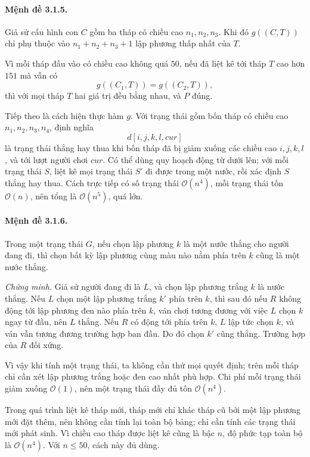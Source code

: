 \documentclass[11pt]{article}
\newcommand{\Oh}{\mathcal{O}}
\begin{document}
\paragraph{Mệnh đề 3.1.5.}
Giả sử cấu hình con \(C\) gồm ba tháp có chiều cao \(n_1,n_2,n_3\). Khi đó
\(g((C,T))\) chỉ phụ thuộc vào \(n_1+n_2+n_3+1\) lập phương thấp nhất của
\(T\).

Vì mỗi tháp đầu vào có chiều cao không quá \(50\), nếu đã liệt kê tới tháp
\(T\) cao hơn \(151\) mà vẫn có
\[
  g((C_1,T))=g((C_2,T)),
\]
thì với mọi tháp \(T\) hai giá trị đều bằng nhau, và \(P\) đúng.

Tiếp theo là cách hiện thực hàm \(g\). Với trạng thái gồm bốn tháp có chiều
cao \(n_1,n_2,n_3,n_4\), định nghĩa
\[
  d[i,j,k,l,\mathit{cur}]
\]
là trạng thái thắng hay thua khi bốn tháp đã bị giảm xuống các chiều cao
\(i,j,k,l\), và tới lượt người chơi \(\mathit{cur}\). Có thể dùng quy hoạch
động từ dưới lên; với mỗi trạng thái \(S\), liệt kê mọi trạng thái \(S'\) đi
được trong một nước, rồi xác định \(S\) thắng hay thua. Cách trực tiếp có số
trạng thái \(\Oh(n^4)\), mỗi trạng thái tốn \(\Oh(n)\), nên tổng là
\(\Oh(n^5)\), quá lớn.

\paragraph{Mệnh đề 3.1.6.}
Trong một trạng thái \(G\), nếu chọn lập phương \(k\) là một nước thắng cho
người đang đi, thì chọn bất kỳ lập phương cùng màu nào nằm phía trên \(k\)
cũng là một nước thắng.

\emph{Chứng minh.}
Giả sử người đang đi là \(L\), và chọn lập phương trắng \(k\) là nước thắng.
Nếu \(L\) chọn một lập phương trắng \(k'\) phía trên \(k\), thì sau đó nếu
\(R\) không động tới lập phương đen nào phía trên \(k\), ván chơi tương đương
với việc \(L\) chọn \(k\) ngay từ đầu, nên \(L\) thắng. Nếu \(R\) có động tới
phía trên \(k\), \(L\) lập tức chọn \(k\), và ván vẫn tương đương trường hợp
ban đầu. Do đó chọn \(k'\) cũng thắng. Trường hợp của \(R\) đối xứng.

Vì vậy khi tính một trạng thái, ta không cần thử mọi quyết định; trên mỗi tháp
chỉ cần xét lập phương trắng hoặc đen cao nhất phù hợp. Chi phí mỗi trạng thái
giảm xuống \(\Oh(1)\), nên một trạng thái đầy đủ tốn \(\Oh(n^4)\).

Trong quá trình liệt kê tháp mới, tháp mới chỉ khác tháp cũ bởi một lập phương
mới đặt thêm, nên không cần tính lại toàn bộ bảng; chỉ cần tính các trạng thái
mới phát sinh. Vì chiều cao tháp được liệt kê cũng là bậc \(n\), độ phức tạp
toàn bộ là \(\Oh(n^4)\). Với \(n\le 50\), cách này đủ dùng.
\end{document}
